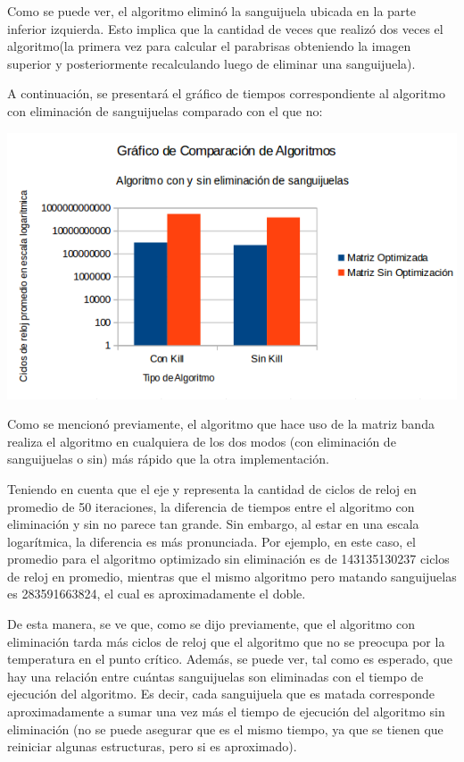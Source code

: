 	\par 
	Como se puede ver, el algoritmo eliminó la sanguijuela ubicada en la parte inferior izquierda. Esto implica que la cantidad de veces que realizó dos veces el algoritmo(la primera vez para calcular el parabrisas obteniendo la imagen superior y posteriormente recalculando luego de eliminar una sanguijuela). 
	\par 
	A continuación, se presentará el gráfico de tiempos correspondiente al algoritmo con eliminación de sanguijuelas comparado con el que no:
\par 	
	\begin{center}
		\includegraphics[scale=0.5]{./img/comparacionkill.png}
	\end{center}
	
	\par 
	Como se mencionó previamente, el algoritmo que hace uso de la matriz banda realiza el algoritmo en cualquiera de los dos modos (con eliminación de sanguijuelas o sin) más rápido que la otra implementación. 
	\par 
	Teniendo en cuenta que el eje y representa la cantidad de ciclos de reloj en promedio de 50 iteraciones, la diferencia de tiempos entre el algoritmo con eliminación y sin no parece tan grande. Sin embargo, al estar en una escala logarítmica, la diferencia es más pronunciada. Por ejemplo, en este caso, el promedio para el algoritmo optimizado sin eliminación es de 143135130237 ciclos de reloj en promedio, mientras que el mismo algoritmo pero matando sanguijuelas es 283591663824, el cual es aproximadamente el doble.
	
	\par 
	De esta manera, se ve que, como se dijo previamente, que el algoritmo con eliminación tarda más ciclos de reloj que el algoritmo que no se preocupa por la temperatura en el punto crítico. Además, se puede ver, tal como es esperado, que hay una relación entre cuántas sanguijuelas son eliminadas con el tiempo de ejecución del algoritmo. Es decir, cada sanguijuela que es matada corresponde aproximadamente a sumar una vez más el tiempo de ejecución del algoritmo  sin eliminación (no se puede asegurar que es el mismo tiempo, ya que se tienen que reiniciar algunas estructuras, pero si es aproximado).
	
